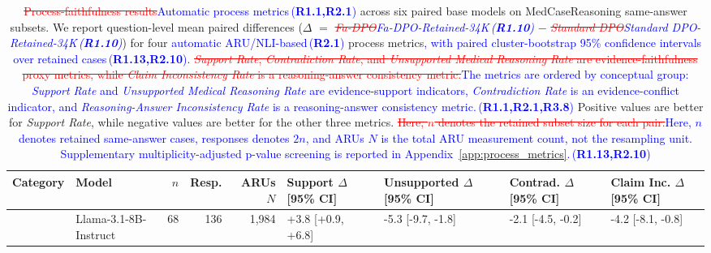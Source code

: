 \documentclass[a4paper,fleqn,doubleblind]{cas-sc}
\DeclareRobustCommand{\deleted}[1]{\textcolor{red}{\sout{#1}}}
\DeclareRobustCommand{\added}[1]{\textcolor{blue}{#1}}
\DeclareRobustCommand{\revtag}[1]{\textcolor{blue}{\scriptsize\,(\textbf{#1})}}
\begin{document}
\begin{table}[htbp]
    \centering
    \scriptsize
    \renewcommand{\arraystretch}{1.12}
    \setlength{\tabcolsep}{3pt}
    \caption[\deleted{Process-faithfulness results}\added{Automatic process metrics}\revtag{R1.1,R2.1} across six paired base models.]{\deleted{Process-faithfulness results}\added{Automatic process metrics}\revtag{R1.1,R2.1} across six paired base models on MedCaseReasoning same-answer subsets. We report question-level mean paired differences ($\Delta$ $=$ \textit{\deleted{Fa-DPO}\added{Fa-DPO-Retained-34K}\revtag{R1.10}} $-$ \textit{\deleted{Standard DPO}\added{Standard DPO-Retained-34K}\revtag{R1.10}}) for four \added{automatic ARU/NLI-based}\revtag{R2.1} process metrics\added{, with paired cluster-bootstrap 95\% confidence intervals over retained cases}\revtag{R1.13,R2.10}. \deleted{\textit{Support Rate}, \textit{Contradiction Rate}, and \textit{Unsupported Medical Reasoning Rate} are evidence-faithfulness proxy metrics, while \textit{Claim Inconsistency Rate} is a reasoning-answer consistency metric.}\added{The metrics are ordered by conceptual group: \textit{Support Rate} and \textit{Unsupported Medical Reasoning Rate} are evidence-support indicators, \textit{Contradiction Rate} is an evidence-conflict indicator, and \textit{Reasoning-Answer Inconsistency Rate} is a reasoning-answer consistency metric.}\revtag{R1.1,R2.1,R3.8} Positive values are better for \textit{Support Rate}, while negative values are better for the other three metrics. \deleted{Here, $n$ denotes the retained subset size for each pair.}\added{Here, $n$ denotes retained same-answer cases, responses denotes $2n$, and ARUs $N$ is the total ARU measurement count, not the resampling unit. Supplementary multiplicity-adjusted p-value screening is reported in Appendix~\ref{app:process_metrics}.}\revtag{R1.13,R2.10}}
    \label{tab:paired_process_summary}
    \begin{adjustbox}{max width=\textwidth}
    \begingroup\color{blue}
    \begin{tabular}{llrrrllll}
    \toprule
    \textbf{Category} & \textbf{Model} & \textbf{$n$} & \textbf{Resp.} & \textbf{ARUs $N$} & \textbf{Support $\Delta$ [95\% CI]} & \textbf{Unsupported $\Delta$ [95\% CI]} & \textbf{Contrad. $\Delta$ [95\% CI]} & \textbf{Claim Inc. $\Delta$ [95\% CI]} \\
    \midrule
     & Llama-3.1-8B-Instruct & 68 & 136 & 1,984 & +3.8 [+0.9, +6.8] & -5.3 [-9.7, -1.8] & -2.1 [-4.5, -0.2] & -4.2 [-8.1, -0.8] \\

\end{tabular}
\end{adjustbox}
\end{table}
\end{document}
